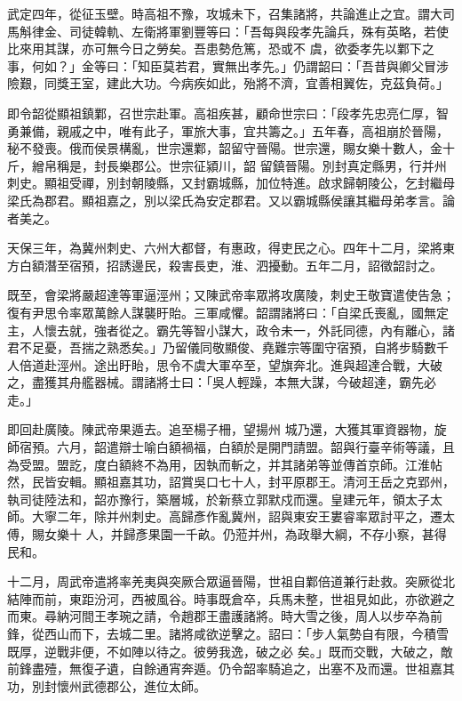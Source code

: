 \begin{pinyinscope}
 武定四年，從征玉壁。時高祖不豫，攻城未下，召集諸將，共論進止之宜。謂大司馬斛律金、司徒韓軌、左衛將軍劉豐等曰：「吾每與段孝先論兵，殊有英略，若使比來用其謀，亦可無今日之勞矣。吾患勢危篤，恐或不
 虞，欲委孝先以鄴下之事，何如？」金等曰：「知臣莫若君，實無出孝先。」仍謂韶曰：「吾昔與卿父冒涉險艱，同獎王室，建此大功。今病疾如此，殆將不濟，宜善相翼佐，克茲負荷。」



 即令韶從顯祖鎮鄴，召世宗赴軍。高祖疾甚，顧命世宗曰：「段孝先忠亮仁厚，智勇兼備，親戚之中，唯有此子，軍旅大事，宜共籌之。」五年春，高祖崩於晉陽，秘不發喪。俄而侯景構亂，世宗還鄴，韶留守晉陽。世宗還，賜女樂十數人，金十斤，繒帛稱是，封長樂郡公。世宗征潁川，韶
 留鎮晉陽。別封真定縣男，行并州刺史。顯祖受禪，別封朝陵縣，又封霸城縣，加位特進。啟求歸朝陵公，乞封繼母梁氏為郡君。顯祖嘉之，別以梁氏為安定郡君。又以霸城縣侯讓其繼母弟孝言。論者美之。



 天保三年，為冀州刺史、六州大都督，有惠政，得吏民之心。四年十二月，梁將東方白額潛至宿預，招誘邊民，殺害長吏，淮、泗擾動。五年二月，詔徵韶討之。



 既至，會梁將嚴超達等軍逼涇州；又陳武帝率眾將攻廣陵，刺史王敬寶遣使告急；
 復有尹思令率眾萬餘人謀襲盱貽。三軍咸懼。韶謂諸將曰：「自梁氏喪亂，國無定主，人懷去就，強者從之。霸先等智小謀大，政令未一，外託同德，內有離心，諸君不足憂，吾揣之熟悉矣。」乃留儀同敬顯俊、堯難宗等圍守宿預，自將步騎數千人倍道赴涇州。途出盱眙，思令不虞大軍卒至，望旗奔北。進與超達合戰，大破之，盡獲其舟艦器械。謂諸將士曰：「吳人輕躁，本無大謀，今破超達，霸先必走。」



 即回赴廣陵。陳武帝果遁去。追至楊子柵，望揚州
 城乃還，大獲其軍資器物，旋師宿預。六月，韶遣辯士喻白額禍福，白額於是開門請盟。韶與行臺辛術等議，且為受盟。盟訖，度白額終不為用，因執而斬之，并其諸弟等並傳首京師。江淮帖然，民皆安輯。顯祖嘉其功，詔賞吳口七十人，封平原郡王。清河王岳之克郢州，執司徒陸法和，韶亦豫行，築層城，於新蔡立郭默戍而還。皇建元年，領太子太師。大寧二年，除并州刺史。高歸彥作亂冀州，詔與東安王婁睿率眾討平之，遷太傅，賜女樂十
 人，并歸彥果園一千畝。仍蒞并州，為政舉大綱，不存小察，甚得民和。



 十二月，周武帝遣將率羌夷與突厥合眾逼晉陽，世祖自鄴倍道兼行赴救。突厥從北結陣而前，東距汾河，西被風谷。時事既倉卒，兵馬未整，世祖見如此，亦欲避之而東。尋納河間王孝琬之請，令趙郡王盡護諸將。時大雪之後，周人以步卒為前鋒，從西山而下，去城二里。諸將咸欲逆擊之。詔曰：「步人氣勢自有限，今積雪既厚，逆戰非便，不如陣以待之。彼勞我逸，破之必
 矣。」既而交戰，大破之，敵前鋒盡殪，無復孑遺，自餘通宵奔遁。仍令韶率騎追之，出塞不及而還。世祖嘉其功，別封懷州武德郡公，進位太師。




\end{pinyinscope}
